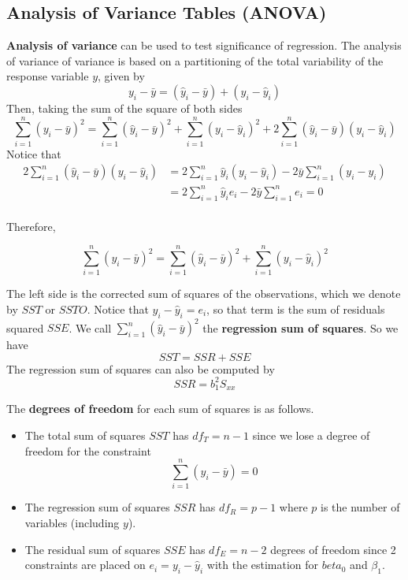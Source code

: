 \subsection{Analysis of Variance Tables (ANOVA)}

\textbf{Analysis of variance} can be used to test significance of regression. The analysis of variance of variance is based on a partitioning of the total variability of the response variable $y$, given by 
\[y_i - \bar{y} = (\hat{y}_i - \bar{y}) + (y_i - \hat{y}_i)\]
Then, taking the sum of the square of both sides
\[\sum_{i=1}^n (y_i - \bar{y})^2 = \sum_{i=1}^n(\hat{y}_i - \bar{y})^2 + \sum_{i=1}^n(y_i - \hat{y}_i)^2 + 2\sum_{i=1}^n(\hat{y}_i - \bar{y})(y_i - \hat{y}_i)\]
Notice that 
\begin{align*}
    2\sum_{i=1}^n(\hat{y}_i - \bar{y})(y_i - \hat{y}_i) &= 2\sum_{i=1}^n \hat{y}_i(y_i - \hat{y}_i) - 2 \bar{y}\sum_{i=1}^n(y_i - \hat{y_i})\\
    &= 2\sum_{i=1}^n \hat{y}_i e_i - 2\bar{y}\sum_{i=1}^n e_i = 0\\
\end{align*}

Therefore, 

\[\sum_{i=1}^n (y_i - \bar{y})^2 = \sum_{i=1}^n (\hat{y}_i - \bar{y})^2 + \sum_{i=1}^n (y_i - \hat{y}_i)^2\]

The left side is the corrected sum of squares of the observations, which we denote by $SST$ or $SSTO$. Notice that $y_i - \hat{y}_i = e_i$, so that term is the sum of residuals squared $SSE$. We call $\sum\limits_{i=1}^n (\hat{y}_i - \bar{y})^2$ the \textbf{regression sum of squares}. So we have 
\[SST =  SSR + SSE\]
The regression sum of squares can also be computed by 
\[SSR = b_1^2S_{xx}\]

The \textbf{degrees of freedom} for each sum of squares is as follows. 

\begin{itemize}
    \item The total sum of squares $SST$ has $df_T = n-1$ since we lose a degree of freedom for the constraint 
    \[\sum_{i=1}^n (y_i - \bar{y}) = 0\]
    \item The regression sum of squares $SSR$ has $df_R = p-1$ where $p$ is the number of variables (including $y$).
    \item The residual sum of squares $SSE$ has $df_E = n-2$ degrees of freedom since 2 constraints are placed on $e_i = y_i - \hat{y}_i$ with the estimation for $beta_0$ and $\beta_1$.
\end{itemize}


